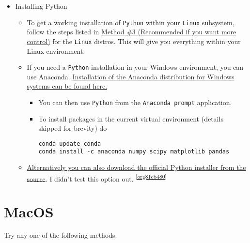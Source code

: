 \documentclass[11pt]{article}
\begin{document}
\begin{itemize}
\item Installing Python
\label{sec:orgf531d3a}

\begin{itemize}
\item To get a working installation of \texttt{Python} within your \texttt{Linux} subsystem, follow
the steps listed in \hyperref[sec:org436cba9]{Method \#3 (Recommended if you want more control)} for the
\texttt{Linux} distros. This will give you everything within your Linux environment.
\item If you need a \texttt{Python} installation in your Windows environment, you can use
Anaconda. \href{https://www.anaconda.com/download/\#windows}{Installation of the Anaconda distribution for Windows systems can be found here.}
\begin{itemize}
\item You can then use \texttt{Python} from the \texttt{Anaconda prompt} application.
\item To install packages in the current virtual environment (details skipped for
brevity) do
\begin{verbatim}
conda update conda
conda install -c anaconda numpy scipy matplotlib pandas
\end{verbatim}
\end{itemize}
\item \href{https://www.python.org/downloads/windows/}{Alternatively you can also download the official Python installer from the source}. I
didn't test this option out. \textsuperscript{\cref{org81cb480}}
\end{itemize}
\end{itemize}

\section*{MacOS}
\label{sec:orgef5f6f9}
Try any one of the following methods.
\end{document}
